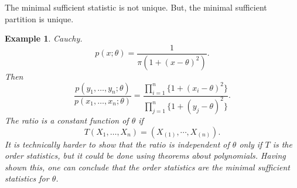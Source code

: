 \documentclass[twoside,12pt]{article}
\newtheorem{example}[theorem]{Example}
\begin{document}
The minimal sufficient statistic is not unique.
But, the minimal sufficient partition is unique.

\begin{example}
Cauchy.
$$
p(x;\theta) = \frac{1}{\pi(1+(x-\theta)^2)}.
$$
Then
$$
\frac{p(y_1,\ldots,y_n;\theta)}{p(x_1,\ldots,x_n;\theta)} =
\frac{\prod\limits^n_{i=1}\{1+(x_i-\theta)^2\}}{\prod\limits^n_{j=1}\{1+(y_j-\theta)^2\}}.
$$
The ratio is a constant function of $\theta$ if 
\[T(X_1,\ldots,X_n) = (X_{(1)}, \cdots, X_{(n)}).\] 
It is technically harder to show that the ratio is independent of $\theta$ only if 
$T$ is the order statistics, but it could be done using 
theorems about polynomials.   Having shown this, one can
conclude that the order statistics are 
the minimal
sufficient statistics for $\theta$.  
\end{example}
\end{document}
